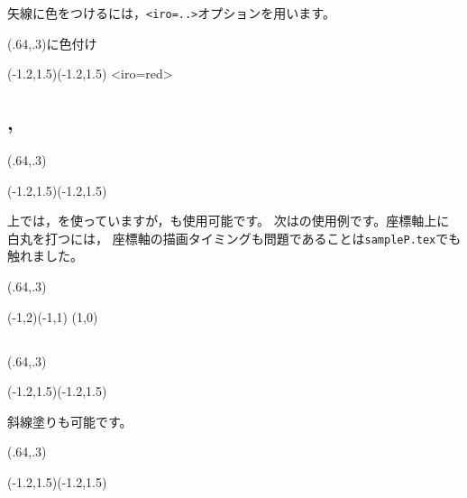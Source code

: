 \documentclass[a4j]{jarticle}
\begin{document}
矢線に色をつけるには，\verb+<iro=..>+オプションを用います。

\begin{showEx}(.64,.3){に色付け}
\begin{pszahyou}[ul=10mm](-1.2,1.5)(-1.2,1.5)
  \ArrowLine<iro=red>\B\D
\end{pszahyou}
\end{showEx}

\subsection{\texorpdfstring{, }{Kuromaru, Siromaru}}
\begin{showEx}(.64,.3){}
\begin{pszahyou}[ul=10mm](-1.2,1.5)(-1.2,1.5)
  \kuromaru{\A;\B;\C;\D}
\end{pszahyou}
\end{showEx}

上では，を使っていますが，も使用可能です。
次はの使用例です。座標軸上に白丸を打つには，
座標軸の描画タイミングも問題であることは\texttt{sampleP.tex}でも触れました。

\begin{showEx}(.64,.3){}
\begin{pszahyou*}[ul=10mm](-1,2)(-1,1)
  \def\A{(1,0)}
  \drawXYaxis
  \Siromaru[2pt]\A
\end{pszahyou*}
\end{showEx}

\subsection{\texorpdfstring{}{Nuritubusi}}
\begin{showEx}(.64,.3){}
\begin{pszahyou}[ul=10mm](-1.2,1.5)(-1.2,1.5)
  \Nuritubusi{\A\B\C\D}
  \Takakkei{\A\B\C\D}
\end{pszahyou}
\end{showEx}

斜線塗りも可能です。

\begin{showEx}(.64,.3){}
\begin{pszahyou}[ul=10mm](-1.2,1.5)(-1.2,1.5)
  \Nuritubusi*{\A\B\C\D}
  \Takakkei{\A\B\C\D}
\end{pszahyou}
\end{showEx}
\end{document}
